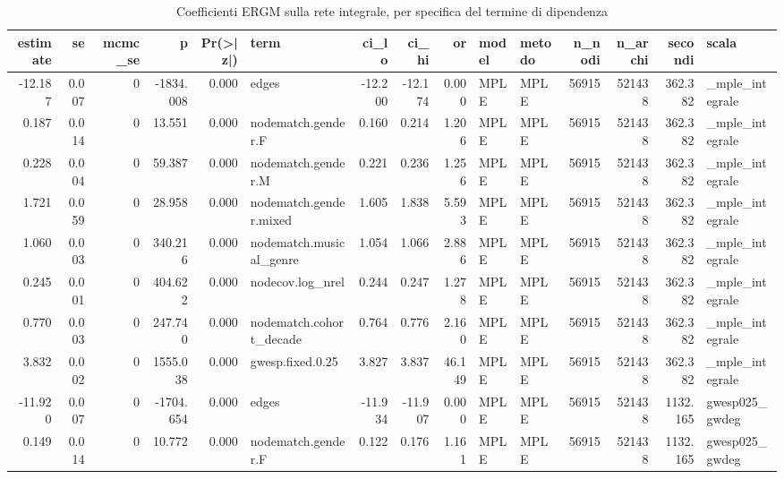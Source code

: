 \begin{table}
\centering
\caption{Coefficienti ERGM sulla rete integrale, per specifica del termine di dipendenza}
\label{tab:t4_ergm_integrale_coefficienti}
\begin{tabular}{rrrrrlrrrllrrrl}
\toprule
 estimate &    se &  mcmc\_se &         p &  Pr(>|z|) &                    term &   ci\_lo &   ci\_hi &      or &        model & metodo &  n\_nodi &  n\_archi &  secondi &            scala \\
\midrule
  -12.187 & 0.007 &        0 & -1834.008 &     0.000 &                   edges & -12.200 & -12.174 &   0.000 &         MPLE &   MPLE &   56915 &   521438 &  362.382 &  \_mple\_integrale \\
    0.187 & 0.014 &        0 &    13.551 &     0.000 &      nodematch.gender.F &   0.160 &   0.214 &   1.206 &         MPLE &   MPLE &   56915 &   521438 &  362.382 &  \_mple\_integrale \\
    0.228 & 0.004 &        0 &    59.387 &     0.000 &      nodematch.gender.M &   0.221 &   0.236 &   1.256 &         MPLE &   MPLE &   56915 &   521438 &  362.382 &  \_mple\_integrale \\
    1.721 & 0.059 &        0 &    28.958 &     0.000 &  nodematch.gender.mixed &   1.605 &   1.838 &   5.593 &         MPLE &   MPLE &   56915 &   521438 &  362.382 &  \_mple\_integrale \\
    1.060 & 0.003 &        0 &   340.216 &     0.000 & nodematch.musical\_genre &   1.054 &   1.066 &   2.886 &         MPLE &   MPLE &   56915 &   521438 &  362.382 &  \_mple\_integrale \\
    0.245 & 0.001 &        0 &   404.622 &     0.000 &        nodecov.log\_nrel &   0.244 &   0.247 &   1.278 &         MPLE &   MPLE &   56915 &   521438 &  362.382 &  \_mple\_integrale \\
    0.770 & 0.003 &        0 &   247.740 &     0.000 & nodematch.cohort\_decade &   0.764 &   0.776 &   2.160 &         MPLE &   MPLE &   56915 &   521438 &  362.382 &  \_mple\_integrale \\
    3.832 & 0.002 &        0 &  1555.038 &     0.000 &        gwesp.fixed.0.25 &   3.827 &   3.837 &  46.149 &         MPLE &   MPLE &   56915 &   521438 &  362.382 &  \_mple\_integrale \\
  -11.920 & 0.007 &        0 & -1704.654 &     0.000 &                   edges & -11.934 & -11.907 &   0.000 &         MPLE &   MPLE &   56915 &   521438 & 1132.165 &   gwesp025\_gwdeg \\
    0.149 & 0.014 &        0 &    10.772 &     0.000 &      nodematch.gender.F &   0.122 &   0.176 &   1.161 &         MPLE &   MPLE &   56915 &   521438 & 1132.165 &   gwesp025\_gwdeg \\

\end{tabular}
\end{table}

